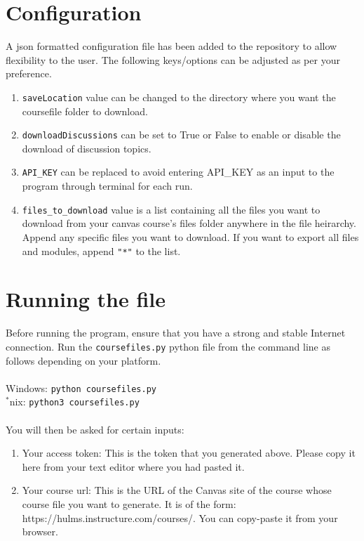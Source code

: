 \documentclass{article}
\begin{document}
\section{Configuration}
A json formatted configuration file has been added to the repository to allow flexibility to the user. The following keys/options can be adjusted as per your preference.
\begin{enumerate}
\item \texttt{saveLocation} value can be changed to the directory where you want the coursefile folder to download.
\item \texttt{downloadDiscussions} can be set to  True or False to enable or disable the download of discussion topics.
\item \texttt{API\_KEY} can be replaced to avoid entering API\_KEY as an input to the program through terminal for each run.
\item \texttt{files\_to\_download} value is a list containing all the files you want to download from your canvas course's files folder anywhere in the file heirarchy. Append any specific files you want to download. If you want to export all files and modules, append \texttt{"*"} to the list.
\end{enumerate}

\section{Running the file}

Before running the program, ensure that you have a strong and stable
Internet connection. Run the \texttt{coursefiles.py} python file from
the command line as follows depending on your platform.
\\\\Windows: \texttt{python\ coursefiles.py}\\
$^*$nix: \texttt{python3\ coursefiles.py}\\\\
You will then be asked for certain inputs: 

\begin{enumerate}
\def\labelenumi{\arabic{enumi}.}
\item Your access token: This is
the token that you generated above. Please copy it here from your text
editor where you had pasted it. 
\item Your course url: This is the URL of
the Canvas site of the course whose course file you want to generate. It is of the form: https://hulms.instructure.com/courses/. You can
copy-paste it from your browser.
\end{enumerate}
\end{document}
